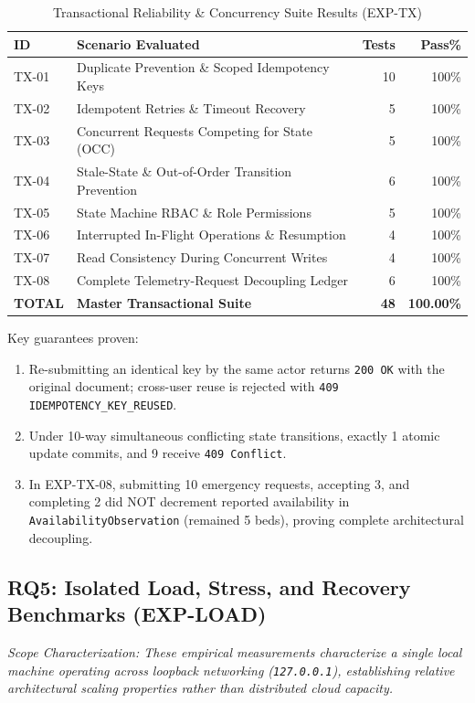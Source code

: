 \documentclass[conference]{IEEEtran}
\begin{document}
\begin{table}[ht]
\centering
\caption{Transactional Reliability \& Concurrency Suite Results (EXP-TX)}
\label{tab:transactional}
\begin{tabularx}{\linewidth}{l p{4.6cm} r r}
\toprule
\textbf{ID} & \textbf{Scenario Evaluated} & \textbf{Tests} & \textbf{Pass\%} \\
\midrule
TX-01 & Duplicate Prevention \& Scoped Idempotency Keys & 10 & 100\% \\
TX-02 & Idempotent Retries \& Timeout Recovery & 5 & 100\% \\
TX-03 & Concurrent Requests Competing for State (OCC) & 5 & 100\% \\
TX-04 & Stale-State \& Out-of-Order Transition Prevention & 6 & 100\% \\
TX-05 & State Machine RBAC \& Role Permissions & 5 & 100\% \\
TX-06 & Interrupted In-Flight Operations \& Resumption & 4 & 100\% \\
TX-07 & Read Consistency During Concurrent Writes & 4 & 100\% \\
TX-08 & Complete Telemetry-Request Decoupling Ledger & 6 & 100\% \\
\midrule
\textbf{TOTAL} & \textbf{Master Transactional Suite} & \textbf{48} & \textbf{100.00\%} \\
\bottomrule
\end{tabularx}
\end{table}

Key guarantees proven:
\begin{enumerate}
    \item Re-submitting an identical key by the same actor returns \texttt{200 OK} with the original document; cross-user reuse is rejected with \texttt{409 IDEMPOTENCY\_KEY\_REUSED}.
    \item Under 10-way simultaneous conflicting state transitions, exactly 1 atomic update commits, and 9 receive \texttt{409 Conflict}.
    \item In EXP-TX-08, submitting 10 emergency requests, accepting 3, and completing 2 did NOT decrement reported availability in \texttt{AvailabilityObservation} (remained 5 beds), proving complete architectural decoupling.
\end{enumerate}

\subsection{RQ5: Isolated Load, Stress, and Recovery Benchmarks (EXP-LOAD)}
\textit{Scope Characterization: These empirical measurements characterize a single local machine operating across loopback networking (\texttt{127.0.0.1}), establishing relative architectural scaling properties rather than distributed cloud capacity.}
\end{document}
